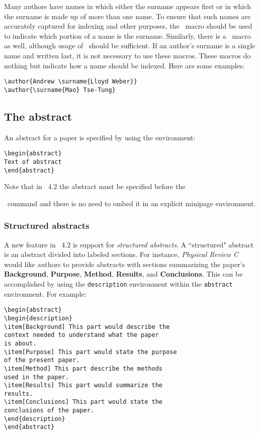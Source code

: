 \documentclass[%
,aps%
 ,twocolumn%
 ,secnumarabic%
,amssymb, amsmath,nobibnotes, aps, prl, floatfix]{revtex4-2}
\begin{document}
Many authors have names in which either the surname appears first
or in which the surname is made up of more than one name. To ensure
that such names are accurately captured for indexing and other
purposes, the \cmd\surname\ macro should be used to indicate which portion
of a name is the surname. Similarly, there is a \cmd\firstname\ macro
as well, although usage of \cmd\surname\ should be sufficient. If an
author's surname is a single name and written last, it is not
necessary to use these macros. These macros do nothing but indicate
how a name should be indexed. Here are some examples:
\begin{verbatim}
\author{Andrew \surname{Lloyd Weber}}
\author{\surname{Mao} Tse-Tung}
\end{verbatim}

\subsection{The abstract}
An abstract for a paper is specified by using the 
environment:
\begin{verbatim}
\begin{abstract}
Text of abstract
\end{abstract}
\end{verbatim}
Note that in \revtex~4.2 the abstract must be specified before the
\cmd\maketitle\ command and there is no need to embed it in an explicit
minipage environment.

\subsubsection{Structured abstracts}
A new feature in \revtex~4.2 is support for \textit{structured abstracts}. A ``structured" abstract is an abstract divided into labeled sections. For instance, \textit{Physical Review C} would like authors to provide abstracts with sections summarizing the paper's  \textbf{Background}, \textbf{Purpose}, \textbf{Method}, \textbf{Results}, and \textbf{Conclusions}. This can be accomplished by using the \texttt{description} environment within the \texttt{abstract} environment.  For example:
\begin{verbatim}
\begin{abstract}
\begin{description}
\item[Background] This part would describe the
context needed to understand what the paper
is about.
\item[Purpose] This part would state the purpose
of the present paper.
\item[Method] This part describe the methods
used in the paper.
\item[Results] This part would summarize the
results.
\item[Conclusions] This part would state the
conclusions of the paper.
\end{description}
\end{abstract}
\end{verbatim}
\end{document}
